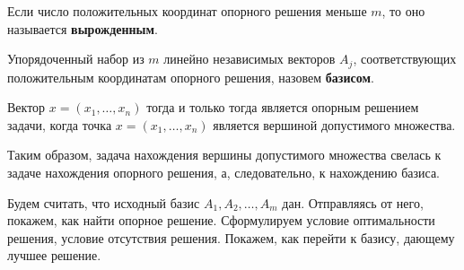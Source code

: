 \documentclass[17pt]{extarticle}
\begin{document}
\begin{definition}
    Если число положительных координат опорного решения меньше \( m \), то оно называется \textbf{вырожденным}.
\end{definition}

\begin{definition}
    Упорядоченный набор из \( m \) линейно независимых векторов \( A_j \), соответствующих положительным координатам опорного решения,
    назовем \textbf{базисом}.
\end{definition}

\begin{theorem}
    Вектор \( x = (x_1, \ldots, x_n) \) тогда и только тогда является опорным решением задачи, когда точка \( x = (x_1, \ldots, x_n) \) является вершиной допустимого множества.
\end{theorem}

Таким образом, задача нахождения вершины допустимого множества свелась к задаче нахождения опорного решения, а, следовательно, к нахождению базиса.

Будем считать, что исходный базис \( A_1, A_2, \ldots, A_m \) дан.
Отправляясь от него, покажем, как найти опорное решение.
Сформулируем условие оптимальности решения, условие отсутствия решения.
Покажем, как перейти к базису, дающему лучшее решение.
\end{document}
